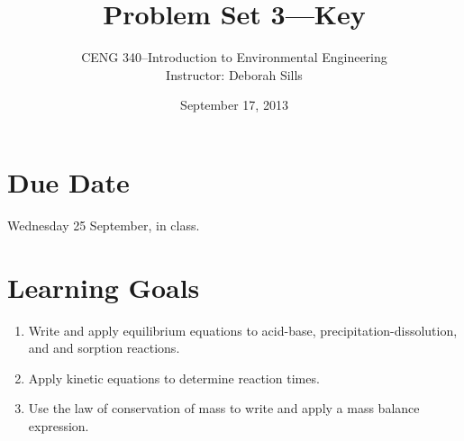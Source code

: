 \documentclass[12pt,letterpaper]{article}
\begin{document}
\setlength{\parindent}{0cm} 


\frenchspacing

\title {Problem Set 3---Key} 
\author {CENG 340--Introduction to Environmental Engineering\\
Instructor: Deborah Sills}
\date {September 17, 2013}
\maketitle

\section *{Due Date}
Wednesday 25 September, in class.
\section *{Learning Goals}
\begin{enumerate}
\item Write and apply equilibrium equations to acid-base, precipitation-dissolution, and and sorption reactions.
\item Apply kinetic equations to determine reaction times.
\item Use the law of conservation of mass to write and apply a mass balance expression.
\end{enumerate}
\end{document}
